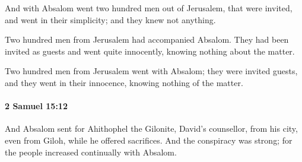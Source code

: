 			\begin{versebox}
					\item[BHS] 
					\item[ASV] And with Absalom went two hundred men out of Jerusalem, that were invited, and went in their simplicity; and they knew not anything.
					\item[NIV] Two hundred men from Jerusalem had accompanied Absalom. They had been invited as guests and went quite innocently, knowing nothing about the matter.
					\item[NRSV] Two hundred men from Jerusalem went with Absalom; they were invited guests, and they went in their innocence, knowing nothing of the matter.
			\end{versebox}

		\paragraph{2 Samuel 15:12} %
			\label{2SAMUEL-15-12}

			And Absalom sent for Ahithophel the Gilonite, David’s counsellor, from his city, even from Giloh, while he offered sacrifices. And the conspiracy was strong; for the people increased continually with Absalom.

